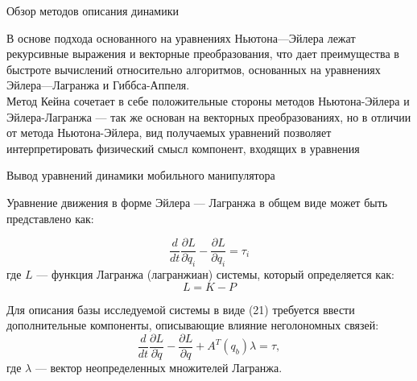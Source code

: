 \documentclass[newPxFont,numfooter,sectionpages]{beamer}
\begin{document}
\begin{frame}{Обзор методов описания динамики }

	\begin{center}
		\begin{minipage}[b]{0.9\textwidth}
		В основе подхода основанного на уравнениях Ньютона---Эйлера лежат рекурсивные выражения и векторные преобразования, что дает преимущества в быстроте вычислений относительно алгоритмов, основанных на уравнениях Эйлера---Лагранжа и Гиббса-Аппеля.
		\ \\
		
		Метод Кейна сочетает в себе положительные стороны методов Ньютона-Эйлера и Эйлера-Лагранжа --- так же основан на векторных преобразованиях, но в отличии от метода Ньютона-Эйлера, вид получаемых уравнений позволяет интерпретировать физический смысл компонент, входящих в уравнения
		\end{minipage}
	\end{center}
\end{frame}


\begin{frame}{Вывод уравнений динамики мобильного манипулятора }
	\begin{center}
		\begin{minipage}[b]{0.9\textwidth}
		Уравнение движения в форме Эйлера --- Лагранжа в общем виде может быть представлено как:
		
\[
\dfrac{d}{dt} \dfrac{\partial L}{\partial \dot{q}_i} - \dfrac{\partial L}{\partial q_i} = \tau_i
\tag{21} \label{eq:21}
\]
\noindent
где $L$ --- функция Лагранжа (лагранжиан) системы, который определяется как:
\begin{equation}
L = K - P
\tag{22} \label{eq:22}
\end{equation}

Для описания базы исследуемой системы в виде (21) требуется ввести дополнительные компоненты, описывающие влияние неголономных связей:
\[
\dfrac{d}{dt} \frac{\partial L}{\partial \dot{q}} - \frac{\partial L}{\partial q} + A^T(q_b)\lambda = \tau,
\tag{23} \label{eq:23}
\]
где $\lambda$ --- вектор неопределенных множителей Лагранжа.
		\end{minipage}
	\end{center}
\end{frame}
	
\end{document}
